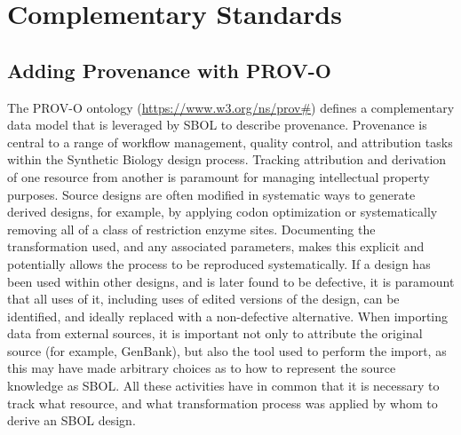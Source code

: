 \section{Complementary Standards}
\label{sec:complementaryStandards}
\subsection{Adding Provenance with PROV-O}
\label{sec:provenance}
\label{sec:prov:Entity}

The PROV-O ontology (\url{https://www.w3.org/ns/prov#}) defines a complementary data model that is leveraged by SBOL to describe provenance. Provenance is central to a range of workflow management, quality control, and attribution tasks within the Synthetic Biology design process. Tracking attribution and derivation of one resource from another is paramount for managing intellectual property purposes. Source designs are often modified in systematic ways to generate derived designs, for example, by applying codon optimization or systematically removing all of a class of restriction enzyme sites.  Documenting the transformation used, and any associated parameters, makes this explicit and potentially allows the process to be reproduced systematically. If a design has been used within other designs, and is later found to be defective, it is paramount that all uses of it, including uses of edited versions of the design, can be identified, and ideally replaced with a non-defective alternative. When importing data from external sources, it is important not only to attribute the original source (for example, GenBank), but also the tool used to perform the import, as this may have made arbitrary choices as to how to represent the source knowledge as SBOL. All these activities have in common that it is necessary to track what resource, and what transformation process was applied by whom to derive an SBOL design.

